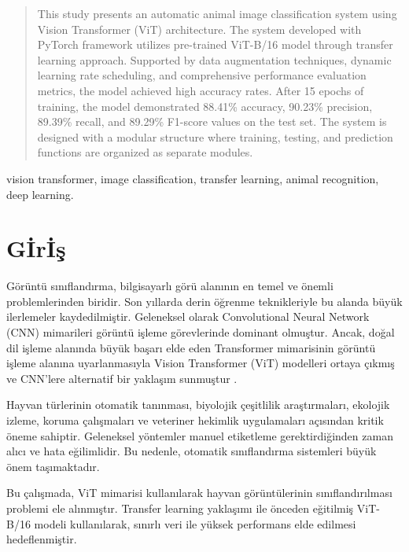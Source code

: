 \documentclass[conference, a4paper]{IEEEtran}
\begin{document}
	\begin{abstract}
		This study presents an automatic animal image classification system using Vision Transformer (ViT) architecture. The system developed with PyTorch framework utilizes pre-trained ViT-B/16 model through transfer learning approach. Supported by data augmentation techniques, dynamic learning rate scheduling, and comprehensive performance evaluation metrics, the model achieved high accuracy rates. After 15 epochs of training, the model demonstrated 88.41\% accuracy, 90.23\% precision, 89.39\% recall, and 89.29\% F1-score values on the test set. The system is designed with a modular structure where training, testing, and prediction functions are organized as separate modules.
	\end{abstract}
	\begin{IEEEkeywords}
		vision transformer, image classification, transfer learning, animal recognition, deep learning.
	\end{IEEEkeywords}
	
	\IEEEpeerreviewmaketitle
	
	\IEEEpubidadjcol
	
	
	\section{G{\footnotesize İ}r{\footnotesize İ}ş}
	
	Görüntü sınıflandırma, bilgisayarlı görü alanının en temel ve önemli problemlerinden biridir. Son yıllarda derin öğrenme teknikleriyle bu alanda büyük ilerlemeler kaydedilmiştir. Geleneksel olarak Convolutional Neural Network ({CNN}) mimarileri görüntü işleme görevlerinde dominant olmuştur. Ancak, doğal dil işleme alanında büyük başarı elde eden Transformer mimarisinin görüntü işleme alanına uyarlanmasıyla Vision Transformer ({ViT}) modelleri ortaya çıkmış ve CNN'lere alternatif bir yaklaşım sunmuştur .
	
	Hayvan türlerinin otomatik tanınması, biyolojik çeşitlilik araştırmaları, ekolojik izleme, koruma çalışmaları ve veteriner hekimlik uygulamaları açısından kritik öneme sahiptir. Geleneksel yöntemler manuel etiketleme gerektirdiğinden zaman alıcı ve hata eğilimlidir. Bu nedenle, otomatik sınıflandırma sistemleri büyük önem taşımaktadır.
	
	Bu çalışmada, {ViT} mimarisi kullanılarak hayvan görüntülerinin sınıflandırılması problemi ele alınmıştır. Transfer learning yaklaşımı ile önceden eğitilmiş ViT-B/16 modeli kullanılarak, sınırlı veri ile yüksek performans elde edilmesi hedeflenmiştir.
	
\end{document}
